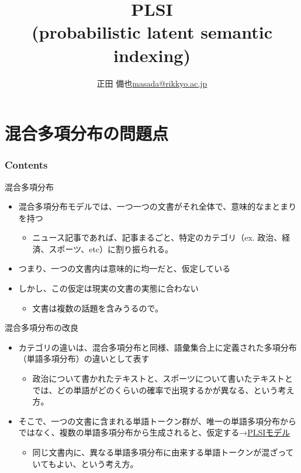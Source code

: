 \documentclass[aspectratio=169,unicode,dvipdfmx,14pt]{beamer}
\title{PLSI \\ (probabilistic latent semantic indexing)}
\author{\texorpdfstring{正田 備也\newline\href{mailto:masada@rikkyo.ac.jp}{masada@rikkyo.ac.jp}}{正田 備也}}
\date{}
\begin{document}
\begin{frame}
\titlepage
\end{frame}

\section{混合多項分布の問題点}

\begin{frame}\frametitle{Contents}
\Large \tableofcontents[currentsection]
\end{frame}

\begin{frame}{混合多項分布}
\begin{itemize}
\item 混合多項分布モデルでは、一つ一つの文書がそれ全体で、意味的なまとまりを持つ
\begin{itemize}
\item ニュース記事であれば、記事まるごと、特定のカテゴリ（ex. 政治、経済、スポーツ、etc）に割り振られる。
\end{itemize}
\item つまり、一つの文書内は意味的に均一だと、仮定している
\item しかし、この仮定は現実の文書の実態に合わない
\begin{itemize}
\item 文書は複数の話題を含みうるので。
\end{itemize}
\end{itemize}
\end{frame}

\begin{frame}{混合多項分布の改良}
\begin{itemize}
\item カテゴリの違いは、混合多項分布と同様、語彙集合上に定義された多項分布（単語多項分布）の違いとして表す
\begin{itemize}
\item 政治について書かれたテキストと、スポーツについて書いたテキストとでは、どの単語がどのくらいの確率で出現するかが異なる、という考え方。
\end{itemize}
\item そこで、一つの文書に含まれる単語トークン群が、唯一の単語多項分布からではなく、複数の単語多項分布から生成されると、仮定する→\underline{PLSIモデル}
\begin{itemize}
\item 同じ文書内に、異なる単語多項分布に由来する単語トークンが混ざっていてもよい、という考え方。
\end{itemize}
\end{itemize}
\end{frame}
\end{document}
